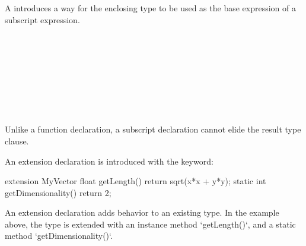 
\begin{Syntax}
     \\
         \\
         \\

     \\
         

     \\
         \SynOpt {}
\end{Syntax}




A  introduces a way for the enclosing type to be used as the base expression of a subscript expression.

\begin{Syntax}
     \\
         \\
        \SynOpt \\
         \\
         \\
         \\
         \\
\end{Syntax}

\begin{Note}
Unlike a function declaration, a subscript declaration cannot elide the result type clause.
\end{Note}



An extension declaration is introduced with the  keyword:

\begin{codeblock}
extension MyVector
{
    float getLength() { return sqrt(x*x + y*y); }
    static int getDimensionality() { return 2; }
}
\end{codeblock}

An extension declaration adds behavior to an existing type.
In the example above, the  type is extended with an instance method `getLength()`, and a static method `getDimensionality()`.

